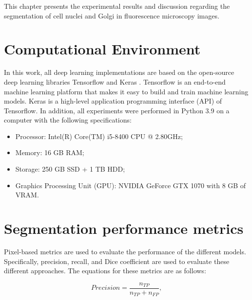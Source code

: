 \label{chap:results}


This chapter presents the experimental results and discussion regarding the segmentation of cell nuclei and Golgi in fluorescence microscopy images.


\section{Computational Environment}

In this work, all deep learning implementations are based on the open-source deep learning libraries Tensorflow and Keras \cite{tensorflow,keras}. Tensorflow is an end-to-end machine learning platform that makes it easy to build and train machine learning models. Keras is a high-level application programming interface (API) of Tensorflow. In addition, all experiments were performed in Python 3.9 on a computer with the following specifications:

\begin{itemize}
    \itemsep0em 
    \item Processor: Intel(R) Core(TM) i5-8400 CPU @ 2.80GHz;
    \item Memory: 16 GB RAM;
    \item Storage: 250 GB SSD + 1 TB HDD;
    \item Graphics Processing Unit (GPU): NVIDIA GeForce GTX 1070 with 8 GB of VRAM.
\end{itemize}

\section{Segmentation performance metrics}
\label{section:metrics}

Pixel-based metrics are used to evaluate the performance of the different models. Specifically, precision, recall, and Dice coefficient are used to evaluate these different approaches. The equations for these metrics are as follows:

\begin{equation}
    Precision = \frac{n_{TP}}{n_{TP}+n_{FP}},
\end{equation}

